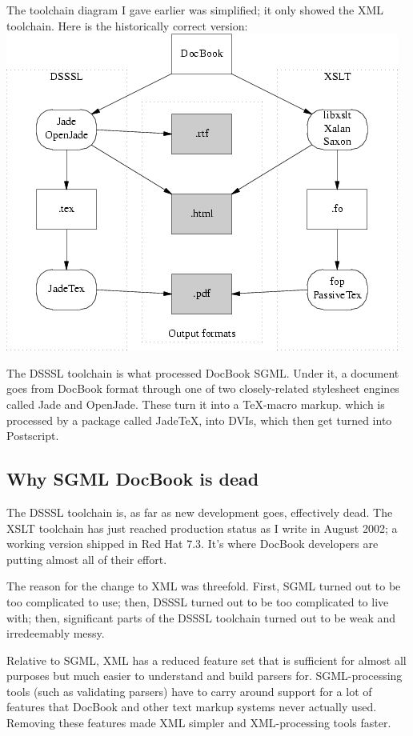 \documentclass[pdftex,english,a4paper,10pt]{infocom}
\begin{document}
The toolchain diagram I gave earlier was simplified; it
only showed the XML toolchain.  Here is the historically
correct version:
{{\includegraphics[]{figure4.png}}}

The DSSSL toolchain is what processed DocBook SGML.
Under it, a document goes from DocBook format through one of two
closely-related stylesheet engines called Jade and OpenJade.  These
turn it into a TeX-macro markup. which is processed by a package called
JadeTeX, into DVIs, which then get turned into Postscript.
\subsection{Why SGML DocBook is dead}
\label{id2717259}\hypertarget{id2717259}{}%

The DSSSL toolchain is, as far as new development goes,
effectively dead.  The XSLT toolchain has just reached production
status as I write in August 2002; a working version shipped in Red Hat
7.3.  It's where DocBook developers are putting almost all of their
effort.

The reason for the change to XML was threefold.  First,
SGML turned out to be too complicated to use; then, DSSSL turned out
to be too complicated to live with; then, significant parts of the
DSSSL toolchain turned out to be weak and irredeemably messy.

Relative to SGML, XML has a reduced feature set that is
sufficient for almost all purposes but much easier to understand and
build parsers for.  SGML-processing tools (such as validating parsers) have
to carry around support for a lot of features that DocBook and other
text markup systems never actually used.  Removing these features
made XML simpler and XML-processing tools faster.
\end{document}
